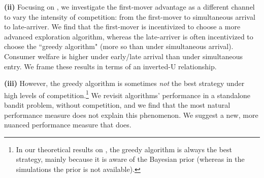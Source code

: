 
\textbf{(ii)} Focusing on \HardMax, we investigate the first-mover advantage as a different channel to vary the intensity of competition: from the first-mover to simultaneous arrival to late-arriver. We find that the first-mover is incentivized to choose a more advanced exploration algorithm, whereas the late-arriver is often incentivized to choose the ``greedy algorithm" (more so than under simultaneous arrival). Consumer welfare is higher under early/late arrival than under simultaneous entry. We frame these results in terms of an inverted-U relationship.


\textbf{(iii)}
However, the greedy algorithm is sometimes \emph{not} the best strategy under high levels of competition.\footnote{In our theoretical results on \HardMax, the greedy algorithm is always the best strategy, mainly because it is aware of the Bayesian prior (whereas in the simulations  the prior is not available).}
We revisit algorithms' performance in a standalone bandit problem, \ie without competition, and we find that the most natural performance measure does not explain this phenomenon. We suggest a new, more nuanced performance measure that does.


